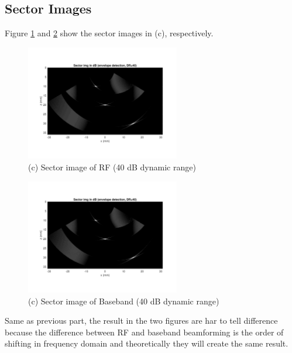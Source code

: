 \documentclass{article}
\begin{document}
\subsection{Sector Images}
Figure \ref{fig:RF-ones-sector} and \ref{fig:Base-ones-sector} show the sector images in (c), respectively.
\begin{figure}[H]
    \centering
    \includegraphics[width=0.6\textwidth]{src/RF/b-9-ones.pdf}
    \caption{(c) Sector image of RF (40 dB dynamic range)}
    \label{fig:RF-ones-sector}
\end{figure}
\begin{figure}[H]
    \centering
    \includegraphics[width=0.6\textwidth]{src/Base/b-6-ones.pdf}
    \caption{(c) Sector image of Baseband (40 dB dynamic range)}
    \label{fig:Base-ones-sector}
\end{figure}
Same as previous part, the result in the two figures are har to tell difference because the difference between RF and baseband 
beamforming is the order of shifting in frequency domain and theoretically they will create the same result.
\end{document}
